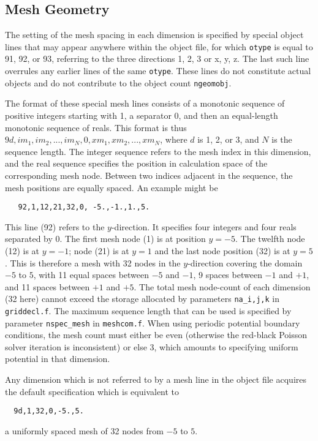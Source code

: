 \documentclass[12pt]{article}
\begin{document}
\subsection{Mesh Geometry}

The setting of the mesh spacing in each dimension is specified by
special object lines that may appear anywhere within the object file,
for which \verb!otype! is equal to 91, 92, or 93, referring to the
three directions 1, 2, 3 or x, y, z. The last such line overrules any
earlier lines of the same \verb!otype!. These lines do not constitute
actual objects and do not contribute to the object count
\verb!ngeomobj!.

The format of these special mesh lines consists of a monotonic
sequence of positive integers starting with 1, a separator 0, and then
an equal-length monotonic sequence of reals. This format is thus
$9d,im_1,im_2,...,im_N,0,xm_1,xm_2,...,xm_N$, where $d$ is 1, 2, or 3,
and $N$ is the sequence length. The integer sequence refers to the
mesh index in this dimension, and the real sequence specifies the
position in calculation space of the corresponding mesh node. Between
two indices adjacent in the sequence, the mesh positions are equally
spaced. An example might be
\begin{verbatim}
   92,1,12,21,32,0, -5.,-1.,1.,5.
\end{verbatim}
This line (92) refers to the $y$-direction. It specifies four integers
and four reals separated by 0. The first mesh node (1) is at position
$y=-5$. The twelfth node (12) is at $y=-1$; node (21) is at $y=1$ and the
last node position (32) is at $y=5$. This is therefore a mesh with 32
nodes in the $y$-direction covering the domain $-5$ to $5$, with 11
equal spaces between $-5$ and $-1$, 9 spaces between $-1$ and $+1$,
and 11 spaces between $+1$ and $+5$. The total mesh node-count of each
dimension (32 here) cannot exceed the storage allocated by parameters
\verb!na_i,j,k! in \verb!griddecl.f!. The maximum sequence length that
can be used is specified by parameter \verb!nspec_mesh! in
\verb!meshcom.f!. When using periodic potential boundary conditions, 
the mesh count must either be even (otherwise the red-black Poisson solver
iteration is inconsistent) or else 3, which amounts to specifying
uniform potential in that dimension.

Any dimension which is not referred to by a mesh line in the object
file acquires the default specification which is equivalent to
\begin{verbatim}
  9d,1,32,0,-5.,5.
\end{verbatim}
a uniformly spaced mesh of 32 nodes from $-5$ to $5$.
\end{document}
